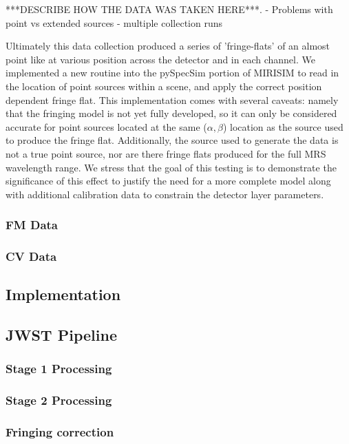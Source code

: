  ***DESCRIBE HOW THE DATA WAS TAKEN HERE***.
 - Problems with point vs extended sources
 - multiple collection runs

\begin{figure}
	\caption{\label{fig:fringeflat}}
\end{figure}
Ultimately this data collection produced a series of 'fringe-flats' of an almost point like at various position across the detector and in each channel.
We implemented a new routine into the pySpecSim portion of MIRISIM to read in the location of point sources within a scene, and apply the correct position dependent fringe flat. 
This implementation comes with several caveats: namely that the fringing model is not yet fully developed, so it can only be considered accurate for point sources located at the same ($\alpha,\beta$) location as the source used to produce the fringe flat. Additionally, the source used to generate the data is not a true point source, nor are there fringe flats produced for the full MRS wavelength range.
We stress that the goal of this testing is to demonstrate the significance of this effect to justify the need for a more complete model along with additional calibration data to constrain the detector layer parameters.
\subsubsection{FM Data}
\subsubsection{CV Data}
\subsection{Implementation}
\subsection{JWST Pipeline}
\cite{Bushouse2015} %
\cite{Labiano-Ortega2016} %
\subsubsection{Stage 1 Processing}
\subsubsection{Stage 2 Processing}
\subsubsection{Fringing correction}
\cite{Carnall2017} %
